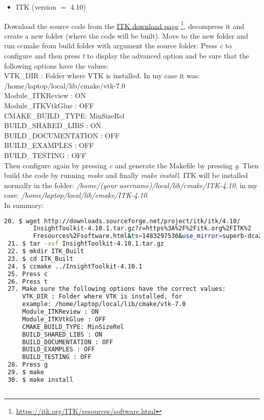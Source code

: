 \documentclass[12pt]{article}
\begin{document}
\begin{itemize}
\item ITK (version $=$ 4.10)
\end{itemize}
\begin{par}
Download the source code from the 
\href{https://itk.org/ITK/resources/software.html }{\color{blue} ITK download page}
\footnote{\url{https://itk.org/ITK/resources/software.html}}, decompress it and create a new folder (where
the code will be built). Move to the new folder and run ccmake from build folder with argument the
source folder. Press \textit{c} to configure and then press \textit{t} to display the advanced
option and be sure that the following options have the values:\\

\noindent
VTK\_DIR : Folder where VTK is installed. In my case it was: /home/laptop/local/lib/cmake/vtk-7.0\\
Module\_ITKReview : ON\\
Module\_ITKVtkGlue : OFF\\
CMAKE\_BUILD\_TYPE: MinSizeRel\\
BUILD\_SHARED\_LIBS : ON\\
BUILD\_DOCUMENTATION : OFF\\
BUILD\_EXAMPLES : OFF\\
BUILD\_TESTING : OFF\\

Then configure again by pressing \textit{c} and generate the Makefile by pressing \textit{g}.
Then build the code by running \textit{make}  and finally \textit{make install}. ITK will be
installed normally in the folder: \textit{/home/(your username)/local/lib/cmake/ITK-4.10}, in
my case: \textit{/home/laptop/local/lib/cmake/ITK-4.10}.\\


In summary:\\

\noindent
\small
\begin{lstlisting}[language=bash]
 20. $ wget http://downloads.sourceforge.net/project/itk/itk/4.10/
        InsightToolkit-4.10.1.tar.gz?r=https%3A%2F%2Fitk.org%2FITK%2
        Fresources%2Fsoftware.html&ts=1483297536&use_mirror=superb-dca2
 21. $ tar -xvf InsightToolkit-4.10.1.tar.gz
 22. $ mkdir ITK_Built
 23. $ cd ITK_Built
 24. $ ccmake ../InsightToolkit-4.10.1
 25. Press c 
 26. Press t
 27. Make sure the following options have the correct values:
     VTK_DIR : Folder where VTK is installed, for 
     example: /home/laptop/local/lib/cmake/vtk-7.0
     Module_ITKReview : ON
     Module_ITKVtkGlue : OFF
     CMAKE_BUILD_TYPE: MinSizeRel
     BUILD_SHARED_LIBS : ON
     BUILD_DOCUMENTATION : OFF
     BUILD_EXAMPLES : OFF
     BUILD_TESTING : OFF
 28. Press g
 29. $ make
 30. $ make install
  
\end{lstlisting}

\end{par}
\normalsize
\end{document}
